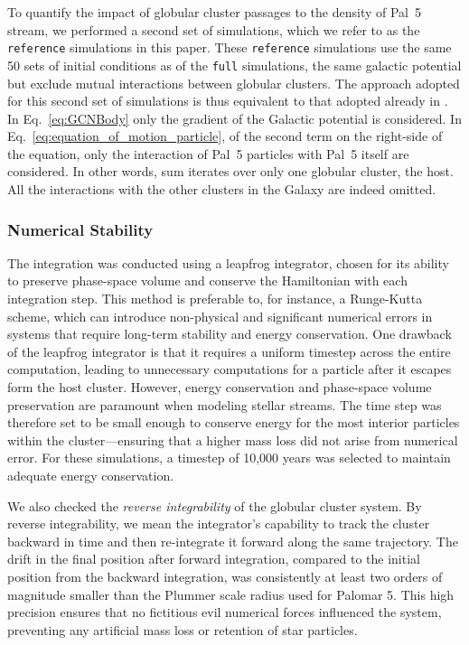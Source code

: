 \documentclass[draft]{aa}
\begin{document}
    To quantify the impact of globular cluster passages to the density of Pal~5 stream, we performed a second set of simulations, which we refer to as the \texttt{reference} simulations in this paper.  These \texttt{reference} simulations use the same 50 sets of initial conditions as of the \texttt{full} simulations, the same galactic potential but exclude mutual interactions between globular clusters. The approach adopted for this second set of simulations is thus equivalent to that adopted already in \citet{2023A&A...673A..44F}. In Eq.~\ref{eq:GCNBody} only the gradient of the Galactic potential  is considered. In Eq.~\ref{eq:equation_of_motion_particle}, of the second term on the right-side of the equation, only the interaction of Pal~5 particles with Pal~5 itself are considered. In other words, sum iterates over only one globular cluster, the host. All the interactions with the other clusters in the Galaxy are indeed omitted.


  \subsubsection*{Numerical Stability}

    The integration was conducted using a leapfrog integrator, chosen for its ability to preserve phase-space volume and conserve the Hamiltonian with each integration step. This method is preferable to, for instance, a Runge-Kutta scheme, which can introduce non-physical and significant numerical errors in systems that require long-term stability and energy conservation. One drawback of the leapfrog integrator is that it requires a uniform timestep across the entire computation, leading to unnecessary computations for a particle after it escapes form the host cluster. However, energy conservation and phase-space volume preservation are paramount when modeling stellar streams. The time step was therefore set to be small enough to conserve energy for the most interior particles within the cluster---ensuring that a higher mass loss did not arise from numerical error. For these simulations, a timestep of 10,000 years was selected to maintain adequate energy conservation. 
    
    We also checked the \textit{reverse integrability} of the globular cluster system. By reverse integrability, we mean the integrator's capability to track the cluster backward in time and then re-integrate it forward along the same trajectory. The drift in the final position after forward integration, compared to the initial position from the backward integration, was consistently at least two orders of magnitude smaller than the Plummer scale radius used for Palomar 5. This high precision ensures that no fictitious evil numerical forces influenced the system, preventing any artificial mass loss or retention of star particles.
\end{document}
